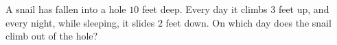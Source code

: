 A snail has fallen into a hole $10$ feet deep. Every day it climbs $3$ feet up, and every night, while sleeping, it slides $2$ feet down. On which day does the snail climb out of the hole?
